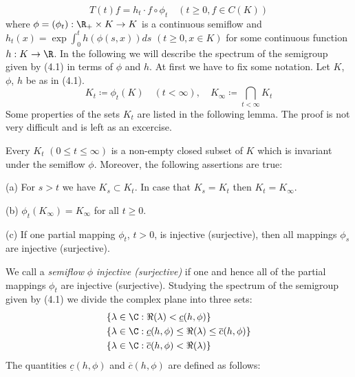 \begin{equation}\label{eq:b3-4.1}
	T(t)f = h_{t}\cdot f\circ\phi_{t} \quad (t \geq 0, f \in C(K)) 
\end{equation}
where $\phi = (\phi_{t}): \R_{+} \times K \to K$ is a continuous semiflow and $h_{t}(x) = \exp\int_{0}^{t} h(\phi(s,x)) ds$ $(t \geq 0, x \in K)$ for some continuous function $h : K \to \R$.
%
%
In the following we will describe the spectrum of the semigroup given by (4.1) in terms of $\phi$ and $h$.
At first we have to fix some notation.
Let $K$, $\phi$, $h$ be as in (4.1).
\begin{equation}\label{eq:b3-4.2}
K_{t} \coloneq \phi_{t}(K) \quad (t < \infty), \quad K_{\infty} \coloneq \bigcap_{t < \infty} K_{t}
\end{equation}
Some properties of the sets $K_t$  are listed in the following lemma.
The proof is not very difficult and is left as an excercise. 
\begin{lemma}\label{lem:b3-4.2}
	Every $K_{t}$ $(0 \leq t \leq \infty)$ is a non-empty closed subset of $K$ which is invariant under the semiflow $\phi$.
	Moreover, the following assertions are true:
	
	(a) For $s > t$ we have $K_{s} \subset K_{t}$.
	In case that $K_{s} = K_{t}$ then $K_{t} = K_{\infty}$.
	
	(b) $\phi_{t}(K_{\infty}) = K_{\infty}$ for all $t \geq 0$.
	
	(c) If one partial mapping $\phi_{t}$, $t > 0$, is injective (surjective), then all mappings $\phi_{s}$ are injective (surjective).
\end{lemma}
We call a \emph{semiflow} $\phi$ \emph{injective (surjective)} if one and hence all of the partial mappings $\phi_{t}$ are injective (surjective).
Studying the spectrum of the semigroup given by (4.1) we divide the complex plane into three sets:
\begin{equation}\label{eq:b3-4.3}
	\begin{aligned}
		&\{\lambda \in \C : \Re(\lambda) < \underline{c}(h,\phi)\} \\
		&\{\lambda \in \C : \underline{c}(h,\phi) \leq \Re(\lambda) \leq \overline{c}(h,\phi)\} \\
		&\{\lambda \in \C : \overline{c}(h,\phi) < \Re(\lambda)\}
	\end{aligned}
\end{equation}
The quantities $\underline{c}(h,\phi)$ and $\overline{c}(h,\phi)$ are defined as follows:
